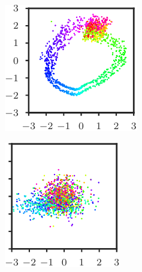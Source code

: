\documentclass[sigconf]{acmart}
\begin{document}
\begin{figure}
	\begin{subfigure}[t]{0.31\columnwidth}
		\centering
		\includegraphics[width=\columnwidth]{z2_latent_space_normal}
		\caption{}\label{fig:z2-latent-space-normal}
	\end{subfigure}\hfill
	\begin{subfigure}[t]{0.2675\columnwidth}
		\centering
		\includegraphics[width=\columnwidth]{z2_latent_space_null}

\end{subfigure}
\end{figure}
\end{document}
